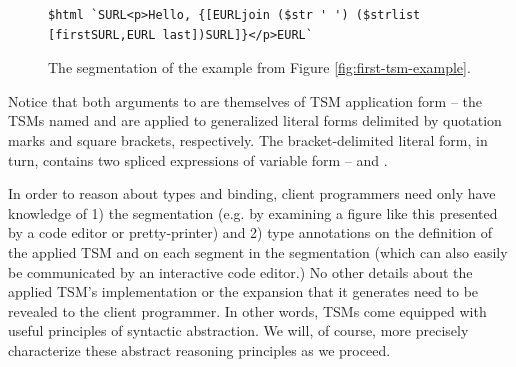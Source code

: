 \begin{figure}[h]
\begin{lstlisting}[numbers=none,xleftmargin=0px]
$html `SURL<p>Hello, {[EURLjoin ($str ' ') ($strlist [firstSURL,EURL last])SURL]}</p>EURL`
\end{lstlisting}
\caption{The segmentation of the example from Figure \ref{fig:first-tsm-example}.}
\label{fig:first-tsm-example-marked}
\end{figure}

Notice that both arguments to  are themselves of TSM application form -- the TSMs named  and  are applied to generalized literal forms  delimited by quotation marks and square brackets, respectively. The bracket-delimited literal form, in turn, contains two spliced expressions of variable form --  and .


 



In order to reason about types and binding, client programmers need only have knowledge of 1) the segmentation (e.g. by examining a figure like this presented by a code editor or pretty-printer) and 2) type annotations on the definition of the applied TSM and on each segment in the segmentation (which can also easily be communicated by an interactive code editor.) No other details about the applied TSM's implementation or the expansion that it generates need to be revealed to the client programmer. In other words, TSMs come equipped with useful principles of syntactic abstraction. We will, of course, more precisely characterize these abstract reasoning principles as we proceed.




